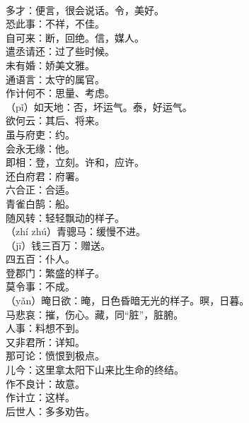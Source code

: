 \documentclass[a4paper, 12pt]{article}
\begin{document}
        \\ 多才：便言，很会说话。令，美好。
        \\ 恐此事：不祥，不佳。
        \\ 自可来：断，回绝。信，媒人。
        \\ 遣丞请还：过了些时候。
        \\ 未有婚：娇美文雅。
        \\ 通语言：太守的属官。
        \\ 作计何不：思量、考虑。
        \\ （p\v{i}）如天地：否，坏运气。泰，好运气。
        \\ 欲何云：其后、将来。
        \\ 虽与府吏：约。
        \\ 会永无缘：他。
        \\ 即相：登，立刻。许和，应许。
        \\ 还白府君：府署。
        \\ 六合正：合适。
        \\ 青雀白鹄：船。
        \\ 随风转：轻轻飘动的样子。
        \\ （zh\'{i} zh\'{u}）青骢马：缓慢不进。
        \\ （j\={i}）钱三百万：赠送。
        \\ 四五百：仆人。
        \\ 登郡门：繁盛的样子。
        \\ 莫令事：不成。
        \\ （y\v{a}n）晻日欲：晻，日色昏暗无光的样子。暝，日暮。
        \\ 马悲哀：摧，伤心。藏，同“脏”，脏腑。
        \\ 人事：料想不到。
        \\ 又非君所：详知。
        \\ 那可论：愤恨到极点。
        \\ 儿今：这里拿太阳下山来比生命的终结。
        \\ 作不良计：故意。
        \\ 作计立：这样。
        \\ 后世人：多多劝告。
\end{document}
